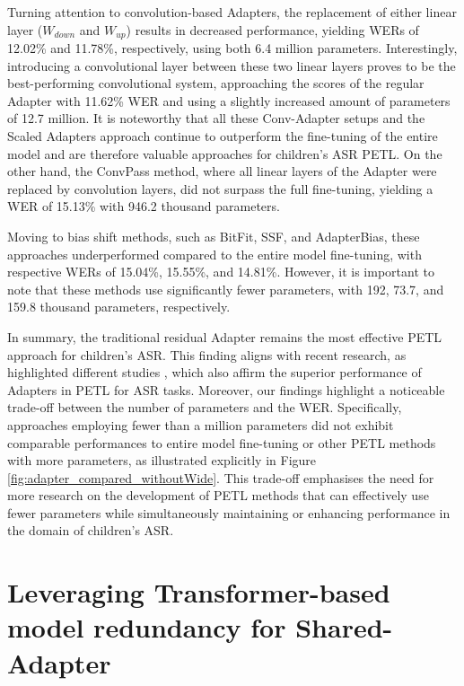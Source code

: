 Turning attention to convolution-based Adapters, the replacement of either linear layer ($W_{down}$ and $W_{up}$) results in decreased performance, yielding WERs of 12.02\% and 11.78\%, respectively, using both 6.4 million parameters. Interestingly, introducing a convolutional layer between these two linear layers proves to be the best-performing convolutional system, approaching the scores of the regular Adapter with 11.62\% \ac{WER} and using a slightly increased amount of parameters of 12.7 million. It is noteworthy that all these Conv-Adapter setups and the Scaled Adapters approach continue to outperform the fine-tuning of the entire model and are therefore valuable approaches for children's \ac{ASR} \ac{PETL}.
On the other hand, the ConvPass method, where all linear layers of the Adapter were replaced by convolution layers, did not surpass the full fine-tuning, yielding a \ac{WER} of 15.13\% with 946.2 thousand parameters.

Moving to bias shift methods, such as BitFit, \ac{SSF}, and AdapterBias, these approaches underperformed compared to the entire model fine-tuning, with respective \acp{WER} of 15.04\%, 15.55\%, and 14.81\%. However, it is important to note that these methods use significantly fewer parameters, with 192, 73.7, and 159.8 thousand parameters, respectively.

In summary, the traditional residual Adapter remains the most effective \ac{PETL} approach for children's \ac{ASR}. This finding aligns with recent research, as highlighted different studies \cite{li2023evaluating,cappellazzo2023parameter}, which also affirm the superior performance of Adapters in \ac{PETL} for \ac{ASR} tasks. Moreover, our findings highlight a noticeable trade-off between the number of parameters and the \ac{WER}. Specifically, approaches employing fewer than a million parameters did not exhibit comparable performances to entire model fine-tuning or other \ac{PETL} methods with more parameters, as illustrated explicitly in Figure \ref{fig:adapter_compared_withoutWide}. This trade-off emphasises the need for more research on the development of \ac{PETL} methods that can effectively use fewer parameters while simultaneously maintaining or enhancing performance in the domain of children's \ac{ASR}.

\section{Leveraging Transformer-based model redundancy for Shared-Adapter}
